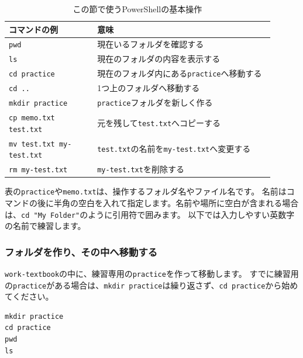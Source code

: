 \begin{table}[htbp]
    \centering
    \caption{この節で使うPowerShellの基本操作}
    \label{tab:chapter01-cli-commands}
    \begin{tabular}{p{0.30\linewidth}p{0.60\linewidth}}
        \toprule
        コマンドの例 & 意味 \\
        \midrule
        \texttt{pwd} & 現在いるフォルダを確認する \\
        \texttt{ls} & 現在のフォルダの内容を表示する \\
        \texttt{cd practice} & 現在のフォルダ内にある\texttt{practice}へ移動する \\
        \texttt{cd ..} & 1つ上のフォルダへ移動する \\
        \texttt{mkdir practice} & \texttt{practice}フォルダを新しく作る \\
        \texttt{cp memo.txt test.txt} & 元を残して\texttt{test.txt}へコピーする \\
        \texttt{mv test.txt my-test.txt} & \texttt{test.txt}の名前を\texttt{my-test.txt}へ変更する \\
        \texttt{rm my-test.txt} & \texttt{my-test.txt}を削除する \\
        \bottomrule
    \end{tabular}
\end{table}

表の\texttt{practice}や\texttt{memo.txt}は、操作するフォルダ名やファイル名です。
名前はコマンドの後に半角の空白を入れて指定します。名前や場所に空白が含まれる場合は、\texttt{cd "My Folder"}のように引用符で囲みます。
以下では入力しやすい英数字の名前で練習します。

\subsubsection*{フォルダを作り、その中へ移動する}

\texttt{work-textbook}の中に、練習専用の\texttt{practice}を作って移動します。
すでに練習用の\texttt{practice}がある場合は、\texttt{mkdir practice}は繰り返さず、\texttt{cd practice}から始めてください。

\begin{listing}[H]
\begin{verbatim}
mkdir practice
cd practice
pwd
ls
\end{verbatim}
\caption{練習用フォルダを作り、その中へ移動する}
\label{lst:chapter01-cli-practice}
\end{listing}

